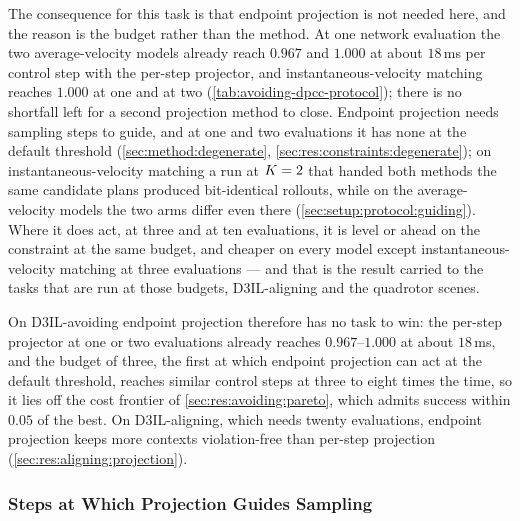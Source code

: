 The consequence for this task is that endpoint projection is not needed here, and the reason is the budget
rather than the method. At one network evaluation the two average-velocity models already reach $0.967$
and $1.000$ at about $18$\,ms per control step with the per-step projector, and instantaneous-velocity
matching reaches $1.000$ at one and at two (\autoref{tab:avoiding-dpcc-protocol}); there is no shortfall
left for a second projection method to close. Endpoint projection needs sampling steps to guide, and at
one and two evaluations it has none at the default threshold (\autoref{sec:method:degenerate},
\autoref{sec:res:constraints:degenerate}); on instantaneous-velocity matching a run at $K=2$ that handed
both methods the same candidate plans produced bit-identical rollouts, while on the average-velocity models
the two arms differ even there (\autoref{sec:setup:protocol:guiding}). Where it does act, at three and at ten
evaluations, it is level or ahead on the constraint at the same budget, and cheaper on every model except
instantaneous-velocity matching at three evaluations --- and that is the result carried to the tasks that are
run at those budgets, D3IL-aligning and the quadrotor scenes.

On D3IL-avoiding endpoint projection therefore has no task to win: the per-step projector at one or two
evaluations already reaches $0.967$--$1.000$ at about $18$\,ms, and the budget of three, the first at which
endpoint projection can act at the default threshold, reaches similar control steps at three to eight times
the time, so it lies off the cost frontier of \autoref{sec:res:avoiding:pareto}, which admits success within
$0.05$ of the best. On D3IL-aligning, which needs twenty
evaluations, endpoint projection keeps more contexts violation-free than per-step projection
(\autoref{sec:res:aligning:projection}).

\subsubsection{Steps at Which Projection Guides Sampling}\label{sec:res:constraints:degenerate}

